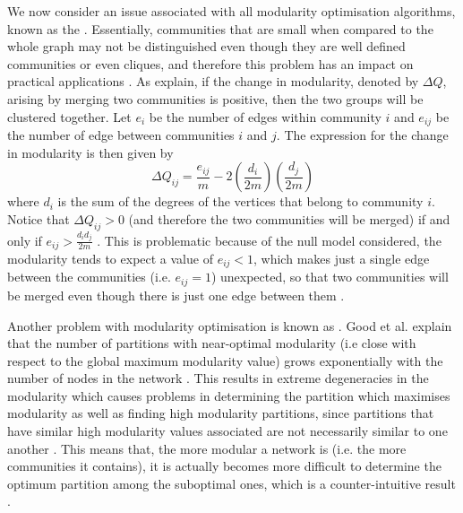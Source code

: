 We now consider an issue associated with all modularity optimisation algorithms, known as the  \cite{GMC10,For10}.
Essentially, communities that are small when compared to the whole graph may not be distinguished even though they are well defined communities or even cliques, and therefore this problem has an impact on practical applications \cite{For10}.
As \cite{GMC10,For10} explain, if the change in modularity, denoted by $\Delta Q$, arising by merging two communities is positive, then the two groups will be clustered together.
Let $e_{i}$ be the number of edges within community $i$ and $e_{ij}$ be the number of edge between communities $i$ and $j$.
The expression for the change in modularity is then given by
\begin{equation}
	\label{eq:resolutionLimit}
	\Delta Q_{ij} = \frac{e_{ij}}{m} -2 \left( \frac{d_{i}}{2m} \right) \left( \frac{d_{j}}{2m} \right)
\end{equation}
where $d_{i}$ is the sum of the degrees of the vertices that belong to community $i$.
Notice that $\Delta Q_{ij} > 0$ (and therefore the two communities will be merged) if and only if $e_{ij} > \frac{d_{i}d_{j}}{2m}$ \cite{GMC10}.
This is problematic because of the null model considered, the modularity tends to expect a value of $e_{ij} < 1$, which makes just a single edge between the communities (i.e. $e_{ij}=1$) unexpected, so that two communities will be merged even though there is just one edge between them \cite{GMC10}.

Another problem with modularity optimisation is known as  \cite{GMC10,For10}.
Good et al. \cite{GMC10} explain that the number of partitions with near-optimal modularity (i.e close with respect to the global maximum modularity value) grows exponentially with the number of nodes in the network \cite{For10}.
This results in extreme degeneracies in the modularity which causes problems in determining the partition which maximises modularity as well as finding high modularity partitions, since partitions that have similar high modularity values associated are not necessarily similar to one another \cite{For10,GMC10}.
This means that, the more modular a network is (i.e. the more communities it contains), it is actually becomes more difficult to determine the optimum partition among the suboptimal ones, which is a counter-intuitive result \cite{GMC10}.

